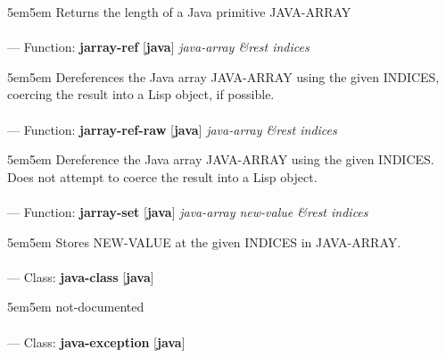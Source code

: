 \begin{adjustwidth}{5em}{5em}
Returns the length of a Java primitive JAVA-ARRAY
\end{adjustwidth}

\paragraph{}
\label{JAVA:JARRAY-REF}
--- Function: \textbf{jarray-ref} [\textbf{java}] \textit{java-array \&rest indices}

\begin{adjustwidth}{5em}{5em}
Dereferences the Java array JAVA-ARRAY using the given INDICES, coercing the result into a Lisp object, if possible.
\end{adjustwidth}

\paragraph{}
\label{JAVA:JARRAY-REF-RAW}
--- Function: \textbf{jarray-ref-raw} [\textbf{java}] \textit{java-array \&rest indices}

\begin{adjustwidth}{5em}{5em}
Dereference the Java array JAVA-ARRAY using the given INDICES. Does not attempt to coerce the result into a Lisp object.
\end{adjustwidth}

\paragraph{}
\label{JAVA:JARRAY-SET}
--- Function: \textbf{jarray-set} [\textbf{java}] \textit{java-array new-value \&rest indices}

\begin{adjustwidth}{5em}{5em}
Stores NEW-VALUE at the given INDICES in JAVA-ARRAY.
\end{adjustwidth}

\paragraph{}
\label{JAVA:JAVA-CLASS}
--- Class: \textbf{java-class} [\textbf{java}] \textit{}

\begin{adjustwidth}{5em}{5em}
not-documented
\end{adjustwidth}

\paragraph{}
\label{JAVA:JAVA-EXCEPTION}
--- Class: \textbf{java-exception} [\textbf{java}] \textit{}

